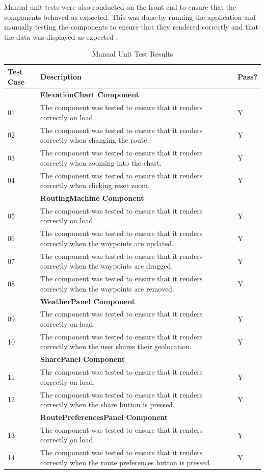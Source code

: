 Manual unit tests were also conducted on the front end to ensure that the components behaved as expected. This was done by running the application and manually testing the components to ensure that they rendered correctly and that the data was displayed as expected .

\begin{table}
\caption{Manual Unit Test Results}
\label{tab:unit-test-results}
\renewcommand{\arraystretch}{1.5} %
\begin{tabular}{ p{1.85cm} p{10cm}  p{1.85cm} }
\hline
Test Case & Description & Pass?\\
\hline
 & \multicolumn{2}{p{11.85cm}}{\textbf{ElevationChart Component}}\\
01 & The component was tested to ensure that it renders correctly on load. & Y\\
02 & The component was tested to ensure that it renders correctly when changing the route. & Y\\
03 & The component was tested to ensure that it renders correctly when zooming into the chart. & Y\\
04 & The component was tested to ensure that it renders correctly when clicking reset zoom. & Y\\
\hline
 & \multicolumn{2}{p{11.85cm}}{\textbf{RoutingMachine Component}}\\
05 & The component was tested to ensure that it renders correctly on load. & Y\\
06 & The component was tested to ensure that it renders correctly when the waypoints are updated. & Y\\
07 & The component was tested to ensure that it renders correctly when the waypoints are dragged. & Y\\
08 & The component was tested to ensure that it renders correctly when the waypoints are removed. & Y\\
\hline
 & \multicolumn{2}{p{11.85cm}}{\textbf{WeatherPanel Component}}\\
09 & The component was tested to ensure that it renders correctly on load. & Y\\
10 & The component was tested to ensure that it renders correctly when the user shares their geolocation. & Y\\
\hline
 & \multicolumn{2}{p{11.85cm}}{\textbf{SharePanel Component}}\\
11 & The component was tested to ensure that it renders correctly on load. & Y\\
12 & The component was tested to ensure that it renders correctly when the share button is pressed. & Y\\
\hline
 & \multicolumn{2}{p{11.85cm}}{\textbf{RoutePreferencesPanel Component}}\\
13 & The component was tested to ensure that it renders correctly on load. & Y\\
14 & The component was tested to ensure that it renders correctly when the route preferences button is pressed. & Y\\
\end{tabular}
\end{table}

